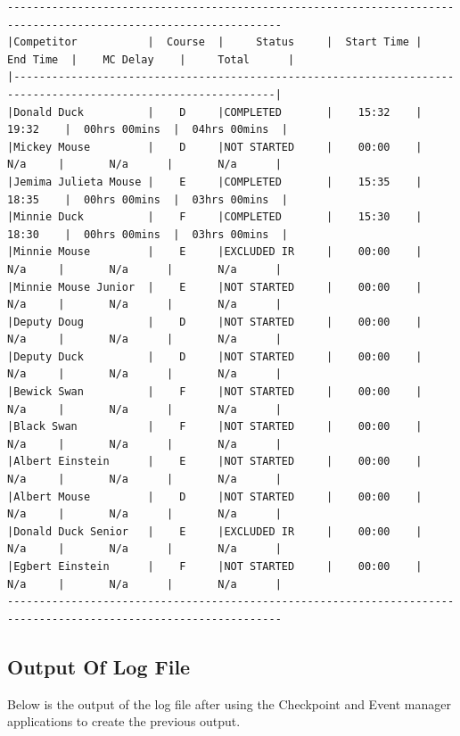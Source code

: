 \documentclass{article}
\begin{document}
\begin{center}
	\begin{lstlisting}[showstringspaces=false, label={lst:results-output}, caption={The results table. With competitors in various states}]
-----------------------------------------------------------------------------------------------------------------
|Competitor           |  Course  |     Status     |  Start Time |   End Time  |    MC Delay    |     Total      |
|---------------------------------------------------------------------------------------------------------------|
|Donald Duck          |    D     |COMPLETED       |    15:32    |    19:32    |  00hrs 00mins  |  04hrs 00mins  |
|Mickey Mouse         |    D     |NOT STARTED     |    00:00    |     N/a     |       N/a      |       N/a      |
|Jemima Julieta Mouse |    E     |COMPLETED       |    15:35    |    18:35    |  00hrs 00mins  |  03hrs 00mins  |
|Minnie Duck          |    F     |COMPLETED       |    15:30    |    18:30    |  00hrs 00mins  |  03hrs 00mins  |
|Minnie Mouse         |    E     |EXCLUDED IR     |    00:00    |     N/a     |       N/a      |       N/a      |
|Minnie Mouse Junior  |    E     |NOT STARTED     |    00:00    |     N/a     |       N/a      |       N/a      |
|Deputy Doug          |    D     |NOT STARTED     |    00:00    |     N/a     |       N/a      |       N/a      |
|Deputy Duck          |    D     |NOT STARTED     |    00:00    |     N/a     |       N/a      |       N/a      |
|Bewick Swan          |    F     |NOT STARTED     |    00:00    |     N/a     |       N/a      |       N/a      |
|Black Swan           |    F     |NOT STARTED     |    00:00    |     N/a     |       N/a      |       N/a      |
|Albert Einstein      |    E     |NOT STARTED     |    00:00    |     N/a     |       N/a      |       N/a      |
|Albert Mouse         |    D     |NOT STARTED     |    00:00    |     N/a     |       N/a      |       N/a      |
|Donald Duck Senior   |    E     |EXCLUDED IR     |    00:00    |     N/a     |       N/a      |       N/a      |
|Egbert Einstein      |    F     |NOT STARTED     |    00:00    |     N/a     |       N/a      |       N/a      |
-----------------------------------------------------------------------------------------------------------------
	\end{lstlisting}
\end{center}

\subsection{Output Of Log File}
Below is the output of the log file after using the Checkpoint and Event manager applications to create the previous output.
\end{document}
